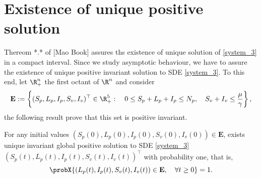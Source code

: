 \section{Existence of unique positive solution}
Thereom *.* of [Mao Book] assures ths existence of unique solution of \eqref{system_3} 
in a compact interval. Since we study asymptotic behaviour, we have to assure the existence of 
unique positive invariant solution to SDE \eqref{system_3}. To this end, let $\R^n_+$ the first octant of $\R ^ n$ and consider  
$$	{
	\mathbf{E}:= 
	\left \{ 
	(S_p, L_p, I_p, S_v, I_v)^{\top} \in \R^5_+: \quad
	0 \leq S_p + L_p + I_p \leq N_p, \quad
	S_v + I_v \leq \frac{\mu}{\gamma}
	\right \},
}
$$
the following result prove that this set is positive invariant.

\begin{theorem}\label{existence-unique}
	For any initial values 
	$
	(S_p(0), L_p(0), I_p(0), S_v(0), I_v(0)) 
	\in \mathbf{E}
	$, 
	exists unique invariant global positive solution to SDE \eqref{system_3}
	$
	(S_p(t), L_p(t), I_p(t) ,S_v(t), I_v(t)) ^{\top}
	$ with probability one, that is,
	\begin{equation*}
	\probX{
		(L_p(t), I_p(t), S_v(t), I_v(t)) 
		\in 
		\mathbf{E}, \quad
		\forall t \geq 0
	} = 1.
	\end{equation*}
\end{theorem}

